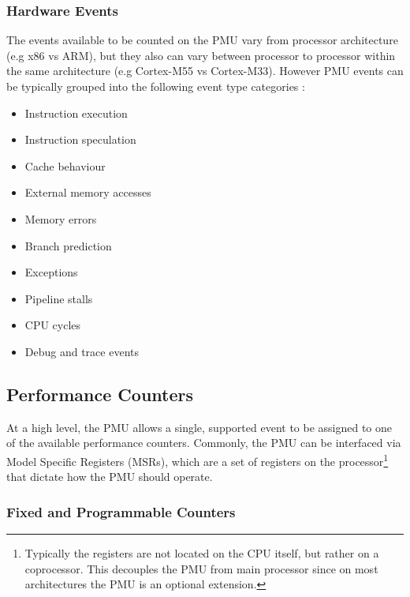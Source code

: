 {\subsubsection{Hardware Events}

The events available to be counted on the PMU vary from processor architecture (e.g x86 vs ARM), but they also can vary between processor to processor within the same architecture (e.g Cortex-M55 vs Cortex-M33). However PMU events can be typically grouped into the following event type categories \cite{DocsArmv8PMU}:

\begin{multicols}{2}
\ssp
\begin{itemize}
    \item Instruction execution
    \item Instruction speculation
    \item Cache behaviour 
    \item External memory accesses
    \item Memory errors
\end{itemize}
\columnbreak
\begin{itemize}
    \item Branch prediction
    \item Exceptions
    \item Pipeline stalls
    \item CPU cycles
    \item Debug and trace events
\end{itemize}
\dsp
\end{multicols}

\subsection{Performance Counters}

At a high level, the PMU allows a single, supported event to be assigned to one of the available performance counters. Commonly, the PMU can be interfaced via Model Specific Registers (MSRs), which are a set of registers on the processor\footnote{Typically the registers are not located on the CPU itself, but rather on a coprocessor. This decouples the PMU from main processor since on most architectures the PMU is an optional extension.} that dictate how the PMU should operate.

\subsubsection{Fixed and Programmable Counters}

}
